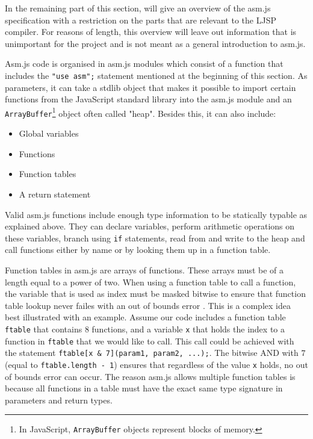 \documentclass[11pt]{report}
\begin{document}
In the remaining part of this section, will give an overview of the asm.js specification with a restriction on the parts that are relevant to the LJSP compiler. For reasons of length, this overview will leave out information that is unimportant for the project and is not meant as a general introduction to asm.js.

Asm.js code is organised in asm.js modules which consist of a function that includes the \texttt{"use asm";} statement mentioned at the beginning of this section. As parameters, it can take a stdlib object that makes it possible to import certain functions from the JavaScript standard library into the asm.js module and an \texttt{ArrayBuffer}\footnote{In JavaScript, \texttt{ArrayBuffer} objects represent blocks of memory.} object often called "heap". Besides this, it can also include:
\begin{itemize}
\item Global variables
\item Functions
\item Function tables
\item A return statement
\end{itemize}

Valid asm.js functions include enough type information to be statically typable as explained above. They can declare variables, perform arithmetic operations on these variables, branch using \texttt{if} statements, read from and write to the heap and call functions either by name or by looking them up in a function table.

Function tables in asm.js are arrays of functions. These arrays must be of a length equal to a power of two. When using a function table to call a function, the variable that is used as index must be masked bitwise to ensure that function table lookup never failes with an out of bounds error \cite{asmjspdf}. This is a complex idea best illustrated with an example. Assume our code includes a function table \texttt{ftable} that contains $8$ functions, and a variable \texttt{x} that holds the index to a function in \texttt{ftable} that we would like to call. This call could be achieved with the statement \texttt{ftable[x \& 7](param1, param2, ...);}. The bitwise AND with $7$ (equal to \texttt{ftable.length - 1}) ensures that regardless of the value \texttt{x} holds, no out of bounds error can occur. The reason asm.js allows multiple function tables is because all functions in a table must have the exact same type signature in parameters and return types.
\end{document}
